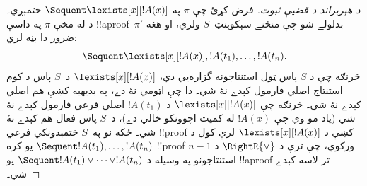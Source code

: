 \documentclass[../../../include/open-logic-section]{subfiles}
\begin{document}
\begin{proof}[د هېربراند د قضيې ثبوت]
فرض کړئ چې $\pi$ په $\Sequent \lexists[x][!A(x)]$ ختمېږي۔ د
 له مخې $\pi$ په داسې !!a{proof}~$\pi'$
بدلولے شو چې منځنے سېکوېنټ~$S$ ولري، او هغه ضرور دا بڼه لري:
\[\Sequent
\lexists[x][!A(x)], !A(t_1), \dots, !A(t_n).\]
څرنګه چې د $S$ پاس ټول استنتاجونه گزاره‌يي دي، $\lexists[x][!A(x)]$
د~$S$ پاس د کوم استنتاج اصلي فارمول کېدے نۀ شي۔ دا چې اټومي
نۀ دے، په بديهيه کښې هم اصلي کېدے نۀ شي۔ څرنګه چې
$\lexists[x][!A(x)]$ د $!A(t_1)$ اصلي فرعي فارمول کېدے نۀ شي
(ياد مو وي چې $!A(x)$ له کميت اچوونکو خالي دے)، د~$S$ پاس
فعال هم کېدے نۀ شي۔ ځکه نو په~$S$ ختمېدونکي فرعي !!{proof}
کښې د $\lexists[x][!A(x)]$ لرې کول د $\Sequent !A(t_1), \dots, !A(t_n)$
يو کره !!{proof} ورکوي، چې ترې د $\RightR{\lor}$ د $n-1$
استنتاجونو په وسيله د $\Sequent !A(t_1) \lor \dots \lor !A(t_n)$
يو !!a{proof} تر لاسه کېدے شي۔
\end{proof}

\end{document}
